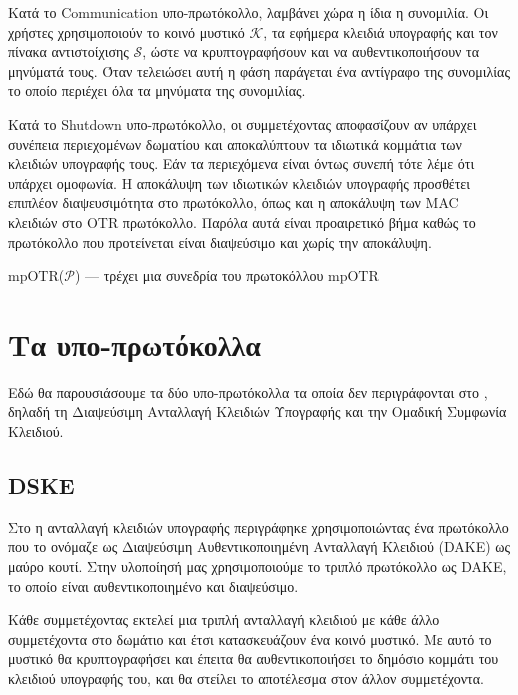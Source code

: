 Κατά το Communication υπο-πρωτόκολλο, λαμβάνει χώρα η ίδια η συνομιλία.
Οι χρήστες χρησιμοποιούν το κοινό μυστικό $\mathcal{K}$, τα εφήμερα κλειδιά υπογραφής και τον πίνακα αντιστοίχισης $\mathcal{S}$, ώστε να κρυπτογραφήσουν και να αυθεντικοποιήσουν τα μηνύματά τους.
Όταν τελειώσει αυτή η φάση παράγεται ένα αντίγραφο της συνομιλίας το οποίο περιέχει όλα τα μηνύματα της συνομιλίας.

Κατά το Shutdown υπο-πρωτόκολλο, οι συμμετέχοντας αποφασίζουν αν υπάρχει συνέπεια περιεχομένων δωματίου και αποκαλύπτουν τα ιδιωτικά κομμάτια των κλειδιών υπογραφής τους.
Εάν τα περιεχόμενα είναι όντως συνεπή τότε λέμε ότι υπάρχει ομοφωνία.
Η αποκάλυψη των ιδιωτικών κλειδιών υπογραφής προσθέτει επιπλέον διαψευσιμότητα στο πρωτόκολλο, όπως και η αποκάλυψη των MAC κλειδιών στο OTR πρωτόκολλο.
Παρόλα αυτά είναι προαιρετικό βήμα καθώς το πρωτόκολλο που προτείνεται είναι διαψεύσιμο και χωρίς την αποκάλυψη.

\begin{algorithm}[t]
  \caption{mpOTR($\mathcal{P}$) --- τρέχει μια συνεδρία του πρωτοκόλλου mpOTR}
  \label{algorithms:mpotr_algo_greek}
  
\end{algorithm}

\section{Τα υπο-πρωτόκολλα}
\label{subprots}

Εδώ θα παρουσιάσουμε τα δύο υπο-πρωτόκολλα τα οποία δεν περιγράφονται στο \cite{mpotr}, δηλαδή τη Διαψεύσιμη Ανταλλαγή Κλειδιών Υπογραφής και την Ομαδική Συμφωνία Κλειδιού.

\subsection{DSKE}
\label{dske_subprot}

Στο\cite{mpotr} η ανταλλαγή κλειδιών υπογραφής περιγράφηκε χρησιμοποιώντας ένα πρωτόκολλο που το ονόμαζε ως Διαψεύσιμη Αυθεντικοποιημένη Ανταλλαγή Κλειδιού (DAKE) ως μαύρο κουτί.
Στην υλοποίησή μας χρησιμοποιούμε το τριπλό \dhname πρωτόκολλο ως DAKE, το οποίο είναι αυθεντικοποιημένο και διαψεύσιμο.

Κάθε συμμετέχοντας εκτελεί μια τριπλή \dhname ανταλλαγή κλειδιού με κάθε άλλο συμμετέχοντα στο δωμάτιο και έτσι κατασκευάζουν ένα κοινό μυστικό.
Με αυτό το μυστικό θα κρυπτογραφήσει και έπειτα θα αυθεντικοποιήσει το δημόσιο κομμάτι του κλειδιού υπογραφής του, και θα στείλει το αποτέλεσμα στον άλλον συμμετέχοντα.

